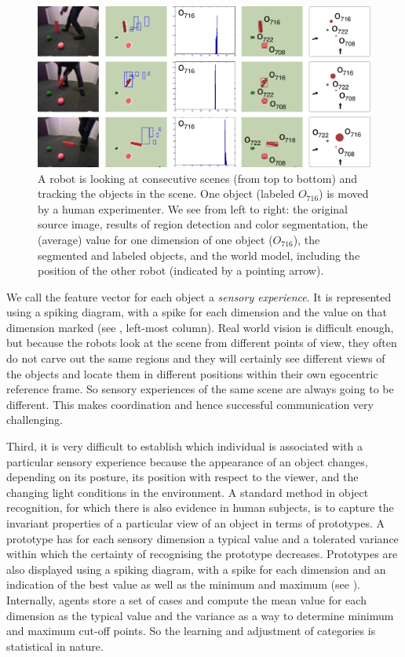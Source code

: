 \begin{figure}[htbp]
  \centerline{\includegraphics[width=.85\textwidth]{chap10/figs/png-perception}}
\caption{\label{fig:png-perception} 
A robot is looking at consecutive scenes (from top to bottom) and tracking the objects in the scene. One object (labeled $O_{716}$)
is moved by a human experimenter.  We see from left to right: the original source image, results of region detection and 
color segmentation, the (average) value for one dimension of one object ($O_{716}$), the segmented and labeled objects, 
and the world model, including the position of the other robot (indicated by a pointing arrow). }
\end{figure}

We call the feature vector for each object a {\itshape sensory experience}. 
It is represented using a spiking 
diagram, with a spike for each dimension and the value on that dimension marked (see 
, left-most column). Real
world vision is difficult enough, but because the robots look at the
scene from different points of view, they often do not carve out the
same regions and they will certainly see different views of the
objects and locate them in different positions within their own
egocentric reference frame. So sensory experiences of the same scene
are always going to be different. This makes coordination and hence successful
communication very challenging. 

Third, it is very difficult to establish which individual is associated with a particular
sensory experience because the appearance of an object changes, depending on
its posture, its position with respect to the viewer, and the changing
light conditions in the environment. A standard method in object
recognition, for which there is also evidence in human subjects, is to
capture the invariant properties of a particular view of an object in
terms of prototypes. A prototype has for each sensory dimension a typical value and a tolerated variance
within which the certainty of recognising the prototype decreases. Prototypes are also displayed using a spiking 
diagram, with a spike for each dimension and an indication of the best value as well as the minimum and maximum
(see ). Internally, agents store a set of cases 
and compute the mean value for each dimension as the typical value and the variance as a way to determine 
minimum and maximum cut-off points. So the learning and adjustment of categories is statistical in nature. 

